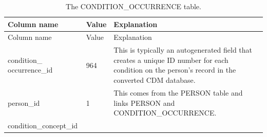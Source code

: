 \documentclass[11pt]{book}
\theoremstyle{definition}
\theoremstyle{definition}
\theoremstyle{definition}
\theoremstyle{remark}
\begin{document}
\begin{longtable}[]{@{}lll@{}}
\caption{\label{tab:conditionOccurrence} The CONDITION\_OCCURRENCE table.}\tabularnewline
\toprule
\begin{minipage}[b]{0.28\columnwidth}\raggedright
Column name\strut
\end{minipage} & \begin{minipage}[b]{0.15\columnwidth}\raggedright
Value\strut
\end{minipage} & \begin{minipage}[b]{0.49\columnwidth}\raggedright
Explanation\strut
\end{minipage}\tabularnewline
\midrule
\endfirsthead
\toprule
\begin{minipage}[b]{0.28\columnwidth}\raggedright
Column name\strut
\end{minipage} & \begin{minipage}[b]{0.15\columnwidth}\raggedright
Value\strut
\end{minipage} & \begin{minipage}[b]{0.49\columnwidth}\raggedright
Explanation\strut
\end{minipage}\tabularnewline
\midrule
\endhead
\begin{minipage}[t]{0.28\columnwidth}\raggedright
condition\_ occurrence\_id\strut
\end{minipage} & \begin{minipage}[t]{0.15\columnwidth}\raggedright
964\strut
\end{minipage} & \begin{minipage}[t]{0.49\columnwidth}\raggedright
This is typically an autogenerated field that creates a unique ID number for each condition on the person's record in the converted CDM database.\strut
\end{minipage}\tabularnewline
\begin{minipage}[t]{0.28\columnwidth}\raggedright
person\_id\strut
\end{minipage} & \begin{minipage}[t]{0.15\columnwidth}\raggedright
1\strut
\end{minipage} & \begin{minipage}[t]{0.49\columnwidth}\raggedright
This comes from the PERSON table and links PERSON and CONDITION\_OCCURRENCE.\strut
\end{minipage}\tabularnewline
\begin{minipage}[t]{0.28\columnwidth}\raggedright
condition\_concept\_id\strut
\end{minipage} & \begin{minipage}[t]{0.15\columnwidth}\raggedright

\end{minipage}
\end{longtable}
\end{document}
